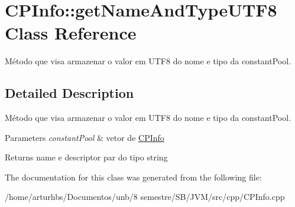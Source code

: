 \hypertarget{classCPInfo_1_1getNameAndTypeUTF8}{}\section{C\+P\+Info\+:\+:get\+Name\+And\+Type\+U\+T\+F8 Class Reference}
\label{classCPInfo_1_1getNameAndTypeUTF8}


Método que visa armazenar o valor em U\+T\+F8 do nome e tipo da constant\+Pool.  




\subsection{Detailed Description}
Método que visa armazenar o valor em U\+T\+F8 do nome e tipo da constant\+Pool. 


\begin{DoxyParams}{Parameters}
{\em constant\+Pool} & vetor de \hyperlink{classCPInfo}{C\+P\+Info} \\
\hline
\end{DoxyParams}
\begin{DoxyReturn}{Returns}
name e descriptor par do tipo string 
\end{DoxyReturn}


The documentation for this class was generated from the following file\+:\begin{DoxyCompactItemize}
\item 
/home/arturhbs/\+Documentos/unb/8 semestre/\+S\+B/\+J\+V\+M/src/cpp/C\+P\+Info.\+cpp\end{DoxyCompactItemize}
